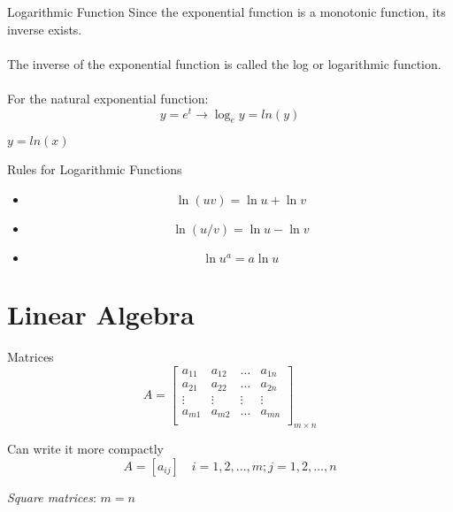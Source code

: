 \documentclass{./../../Latex/teaching_slides}
\begin{document}
\begin{frame}{Logarithmic Function}
Since the exponential function is a monotonic function, its inverse exists. \\~\\
The inverse of the exponential function is called the log or logarithmic function. \\~\\
For the natural exponential function:
\[y=e^{t} \rightarrow \log _{e} y =ln(y) \]
\end{frame}

\begin{frame}{$y=ln(x)$}
\centering
{} 
\end{frame}

\begin{frame}{Rules for Logarithmic Functions}
\begin{itemize}
	\item[] $$\ln (u v)=\ln u+\ln v$$
	\item[] $$\ln (u / v)=\ln u-\ln v$$
	\item[] $$\ln u^{a}=a \ln u$$
\end{itemize}
\end{frame}




\section{Linear Algebra}

\begin{frame}{Matrices}
$$A = \begin{bmatrix}
a_{11} & a_{12}  & \hdots & a_{1n} \\
a_{21} & a_{22}  & \hdots & a_{2n} \\
\vdots & \vdots  & \vdots & \vdots \\
a_{m1} & a_{m2}  & \hdots & a_{mn} \\
\end{bmatrix}_{m \times n}$$

\vspace{1em}
Can write it more compactly
$$ A = [ a_{ij} ] \quad i=1,2,...,m; j=1,2,...,n$$ 

\textit{Square matrices}: $m=n$
\end{frame}
\end{document}
